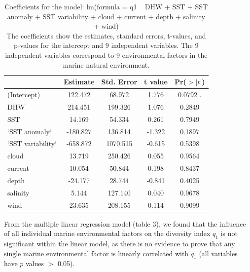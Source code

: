 \documentclass[a4paper, 11]{article}
\begin{document}
\begin{table}[H]
\centering
\begin{tabular}{lcccc}
\toprule
 & Estimate & Std. Error & t value & Pr($>|t|$) \\
\midrule
(Intercept) & 122.472 & 68.972 & 1.776 & 0.0792 . \\
DHW & 214.451 & 199.326 & 1.076 & 0.2849 \\
SST & 14.169 & 54.334 & 0.261 & 0.7949 \\
‘SST anomaly‘ & -180.827 & 136.814 & -1.322 & 0.1897 \\
‘SST variability‘ & -658.872 & 1070.515 & -0.615 & 0.5398 \\
cloud & 13.719 & 250.426 & 0.055 & 0.9564 \\
current & 10.054 & 50.844 & 0.198 & 0.8437 \\
depth & -24.177 & 28.744 & -0.841 & 0.4025 \\
salinity & 5.144 & 127.140 & 0.040 & 0.9678 \\
wind & 23.635 & 208.155 & 0.114 & 0.9099 \\
\bottomrule
\end{tabular}
\caption{Coefficients for the model: lm(formula = q1 ~ DHW + SST + SST anomaly + SST variability + cloud + current + depth + salinity + wind)\\
The coefficients show the estimates, standard errors, t-values, and p-values for the intercept and 9 independent variables. The 9 independent variables correspond to 9 environmental factors in the marine natural environment.}
\label{tab:model_coefficients}
\end{table}

From the multiple linear regression model (table 3), we found that the influence of all individual marine environmental factors on the diversity index \(q_1\) is not significant within the linear model, as there is no evidence to prove that any single marine environmental factor is linearly correlated with \(q_1\) (all variables have \(p\) values $>$ 0.05). 
\end{document}
